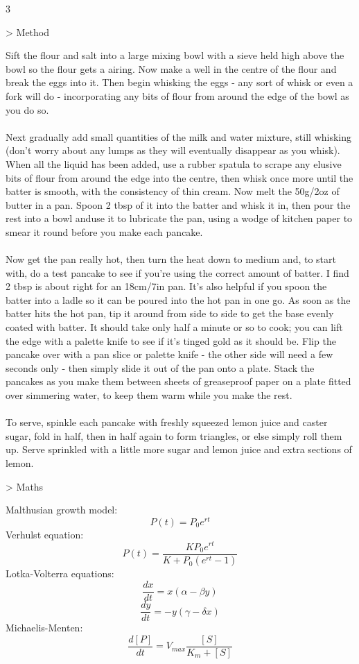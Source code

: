 \documentclass[a0,final]{a0poster}
\newenvironment{Section}[1]				%
{
\par 
\flushleft
\colorbox{boxcol}{%
\sffamily\large\color{headingcol}> \color{white} #1%
\hspace{0.5cm}}
\par\nobreak 
\nointerlineskip 						%
\setlength\parskip{-1pt}					%
\begin{lrbox}\envbox						%
\begin{minipage}{0.95\columnwidth}		%
}
{\par
\end{minipage}\end{lrbox}				%
\fcolorbox{boxcol}{fillcol}{\usebox\envbox}	%
\vspace{1cm}							%
}
\begin{document}
\begin{multicols}{3}
\begin{Section}{Method}
Sift the flour and salt into a large mixing bowl with a sieve held high above the bowl so the flour gets a airing. Now make a well in the centre of the flour and break the eggs into it. Then begin whisking the eggs - any sort of whisk or even a fork will do - incorporating any bits of flour from around the edge of the bowl as you do so.\\
\\
Next gradually add small quantities of the milk and water mixture, still whisking (don't worry about any lumps as they will eventually disappear as you whisk). When all the liquid has been added, use a rubber spatula to scrape any elusive bits of flour from around the edge into the centre, then whisk once more until the batter is smooth, with the consistency of thin cream. Now melt the 50g/2oz of butter in a pan. Spoon 2 tbsp of it into the batter and whisk it in, then pour the rest into a bowl anduse it to lubricate the pan, using a wodge of kitchen paper to smear it round before you make each pancake.\\
\\
Now get the pan really hot, then turn the heat down to medium and, to start with, do a test pancake to see if you're using the correct amount of batter. I find 2 tbsp is about right for an 18cm/7in pan. It's also helpful if you spoon the batter into a ladle so it can be poured into the hot pan in one go. As soon as the batter hits the hot pan, tip it around from side to side to get the base evenly coated with batter. It should take only half a minute or so to cook; you can lift the edge with a palette knife to see if it's tinged gold as it should be. Flip the pancake over with a pan slice or palette knife - the other side will need a few seconds only - then simply slide it out of the pan onto a plate.
Stack the pancakes as you make them between sheets of greaseproof paper on a plate fitted over simmering water, to keep them warm while you make the rest.\\
\\
To serve, spinkle each pancake with freshly squeezed lemon juice and caster sugar, fold in half, then in half again to form triangles, or else simply roll them up. Serve sprinkled with a little more sugar and lemon juice and extra sections of lemon.
\end{Section}
\columnbreak

\begin{Section}{Maths}
Malthusian growth model:
$$P(t) = P_0 e^{rt}$$
Verhulst equation:
$$P(t) = \frac{K P_0 e^{rt}}{K + P_0 (e^{rt} - 1)}$$
Lotka-Volterra equations:
$$\frac{dx}{dt} = x(\alpha - \beta y)$$
$$\frac{dy}{dt} = - y(\gamma - \delta x)$$
Michaelis-Menten:
$$\frac{d[P]}{dt} = V_{max} \frac{[S]}{K_m + [S]}$$
\end{Section}


\end{multicols}
\end{document}
